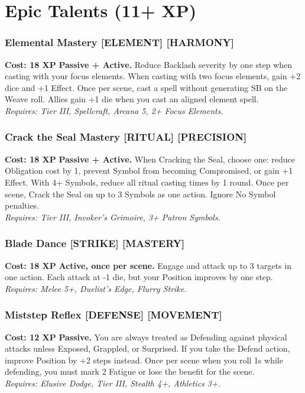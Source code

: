\section{Epic Talents (11+ XP)}
\label{sec:epic-talents}

\subsubsection*{Elemental Mastery \textnormal{[ELEMENT] [HARMONY]}}
\label{talent:elemental-mastery}
\textbf{Cost: 18 XP} \textbf{Passive + Active.} Reduce Backlash severity by one step when casting with your focus elements. When casting with two focus elements, gain +2 dice and +1 Effect. Once per scene, cast a spell without generating SB on the Weave roll. Allies gain +1 die when you cast an aligned element spell. \\
\textit{Requires: Tier III, Spellcraft, Arcana 5, 2+ Focus Elements.}

\subsubsection*{Crack the Seal Mastery \textnormal{[RITUAL] [PRECISION]}}
\label{talent:crack-seal-mastery}
\textbf{Cost: 18 XP} \textbf{Passive + Active.} When Cracking the Seal, choose one: reduce Obligation cost by 1, prevent Symbol from becoming Compromised, or gain +1 Effect. With 4+ Symbols, reduce all ritual casting times by 1 round. Once per scene, Crack the Seal on up to 3 Symbols as one action. Ignore No Symbol penalties. \\
\textit{Requires: Tier III, Invoker's Grimoire, 3+ Patron Symbols.}

\subsubsection*{Blade Dance \textnormal{[STRIKE] [MASTERY]}}
\label{talent:blade-dance}
\textbf{Cost: 18 XP} \textbf{Active, once per scene.} Engage and attack up to 3 targets in one action. Each attack at -1 die, but your Position improves by one step. \\
\textit{Requires: Melee 5+, Duelist's Edge, Flurry Strike.}

\subsubsection*{Miststep Reflex \textnormal{[DEFENSE] [MOVEMENT]}}
\label{talent:miststep-reflex}
\textbf{Cost: 12 XP} \textbf{Passive.} You are always treated as Defending against physical attacks unless Exposed, Grappled, or Surprised. If you take the Defend action, improve Position by +2 steps instead. Once per scene when you roll 1s while defending, you must mark 2 Fatigue or lose the benefit for the scene. \\
\textit{Requires: Elusive Dodge, Tier III, Stealth 4+, Athletics 3+.}

